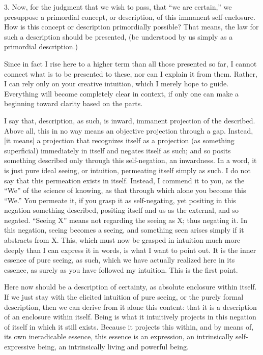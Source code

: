 3. Now, for the judgment
that we wish to pass,
that “we are certain,”
we presuppose a primordial concept, or description,
of this immanent self-enclosure.
How is this concept or description primordially possible?
That means, the law for such a description should be presented,
(be understood by us simply as a primordial description.)

Since in fact I rise here to a higher term
than all those presented so far,
I cannot connect what is to be presented to these,
nor can I explain it from them.
Rather, I can rely only on your creative intuition,
which I merely hope to guide.
Everything will become completely clear in context,
if only one can make a beginning toward clarity
based on the parts.

I say that, description, as such,
is inward, immanent projection of the described.
Above all, this in no way means
an objective projection through a gap.
Instead, [it means] a projection
that recognizes itself as a projection
(as something superficial)
immediately in itself
and negates itself as such;
and so posits something described
only through this self-negation,
an inwardness.
In a word, it is just pure ideal seeing,
or intuition, permeating itself simply as such.
I do not say that this permeation exists in itself.
Instead, I commend it to you,
as the “We” of the science of knowing,
as that through which alone you become this “We.”
You permeate it, if you grasp it as self-negating,
yet positing in this negation something described,
positing itself and us as the external, and so negated.
“Seeing X” means not regarding the seeing as X;
thus negating it.
In this negation, seeing becomes a seeing,
and something seen arises simply
if it abstracts from X.
This, which must now be grasped in intuition
much more deeply than I can express it in words,
is what I want to point out.
It is the inner essence of pure seeing,
as such, which we have actually realized here in its essence,
as surely as you have followed my intuition.
This is the first point.

Here now should be a description of certainty,
as absolute enclosure within itself.
If we just stay with the elicited intuition of pure seeing,
or the purely formal description,
then we can derive from it alone this content:
that it is a description of an enclosure within itself.
Being is what it intuitively projects
in this negation of itself in which it still exists.
Because it projects this within, and by means of,
its own ineradicable essence, this essence is an expression,
an intrinsically self-expressive being,
an intrinsically living and powerful being.

